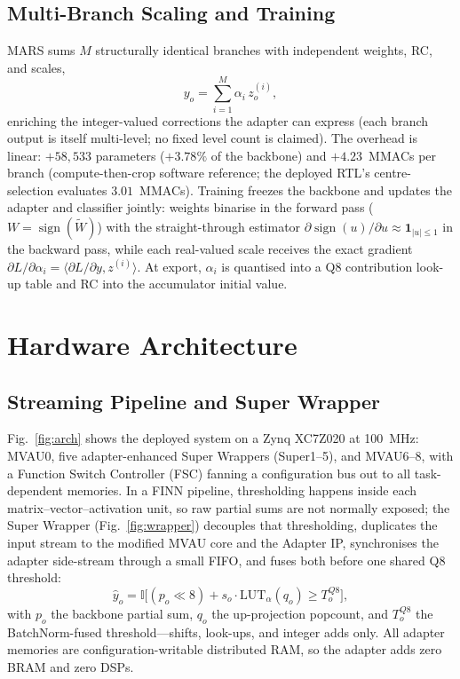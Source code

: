 \documentclass[conference]{IEEEtran}
\begin{document}
\subsection{Multi-Branch Scaling and Training}
MARS sums $M$ structurally identical branches with independent weights, RC, and scales,
\begin{equation}
y_o = \sum_{i=1}^{M} \alpha_i\, z_o^{(i)},
\label{eq:mb}
\end{equation}
enriching the integer-valued corrections the adapter can express (each branch output is itself multi-level; no fixed level count is claimed). The overhead is linear: $+58{,}533$ parameters ($+3.78\%$ of the backbone) and $+4.23$~MMACs per branch (compute-then-crop software reference; the deployed RTL's centre-selection evaluates $3.01$~MMACs). Training freezes the backbone and updates the adapter and classifier jointly: weights binarise in the forward pass ($W = \operatorname{sign}(\widetilde{W})$) with the straight-through estimator $\partial \operatorname{sign}(u)/\partial u \approx \mathbf{1}_{|u|\le 1}$ in the backward pass, while each real-valued scale receives the exact gradient $\partial L/\partial \alpha_i = \langle \partial L/\partial y, z^{(i)} \rangle$. At export, $\alpha_i$ is quantised into a Q8 contribution look-up table and RC into the accumulator initial value.

\section{Hardware Architecture}
\subsection{Streaming Pipeline and Super Wrapper}
Fig.~\ref{fig:arch} shows the deployed system on a Zynq XC7Z020 at 100~MHz: MVAU0, five adapter-enhanced Super Wrappers (Super1--5), and MVAU6--8, with a Function Switch Controller (FSC) fanning a configuration bus out to all task-dependent memories. In a FINN pipeline, thresholding happens inside each matrix--vector--activation unit, so raw partial sums are not normally exposed; the Super Wrapper (Fig.~\ref{fig:wrapper}) decouples that thresholding, duplicates the input stream to the modified MVAU core and the Adapter IP, synchronises the adapter side-stream through a small FIFO, and fuses both before one shared Q8 threshold:
\begin{equation}
\hat{y}_o = \mathbb{I}\bigl[(p_o \ll 8) + s_o \cdot \mathrm{LUT}_{\alpha}(q_o) \ge T^{Q8}_o\bigr],
\label{eq:fusion}
\end{equation}
with $p_o$ the backbone partial sum, $q_o$ the up-projection popcount, and $T^{Q8}_o$ the BatchNorm-fused threshold---shifts, look-ups, and integer adds only. All adapter memories are configuration-writable distributed RAM, so the adapter adds zero BRAM and zero DSPs.
\end{document}

